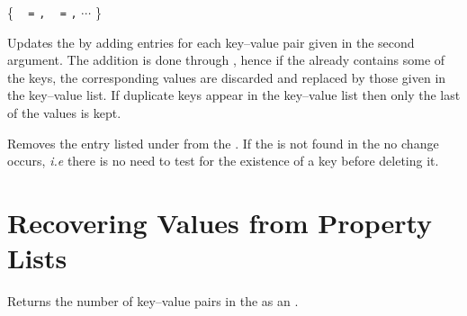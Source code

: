 \documentclass[oneside]{book}
\begin{document}
\begin{function}{\PropPutFromKeyval}
\begin{syntax}
 
\{
~  \verb|=|  \verb|,|
~  \verb|=|  \verb|,| $\cdots$
\}
\end{syntax}
Updates the  by adding entries for each key--value
pair given in the second argument.  The addition is done through
, hence if the  already contains
some of the keys, the corresponding values are discarded and
replaced by those given in the key--value list.  If duplicate keys
appear in the key--value list then only the last of the values is kept.
\begin{codehigh}
\PropSetFromKeyval {}
\PropPutFromKeyval {}
\PropVarLog \lTmpaProp
\end{codehigh}
\end{function}

\begin{function}{\PropVarRemove}
\begin{syntax}
  
\end{syntax}
Removes the entry listed under  from the
.  If the  is
not found in the  no change occurs,
\emph{i.e} there is no need to test for the existence of a key before
deleting it.
\begin{codehigh}
\PropSetFromKeyval {}
\PropVarRemove {}
\PropVarLog \lTmpaProp
\end{codehigh}
\end{function}

\section{Recovering Values from Property Lists}

\begin{function}{\PropVarCount}
\begin{syntax}
 
\end{syntax}
Returns the number of key--value pairs in the 
as an .
\begin{demohigh}
\PropSetFromKeyval {}
\PropVarCount \lTmpaProp
\end{demohigh}
\end{function}
\end{document}
